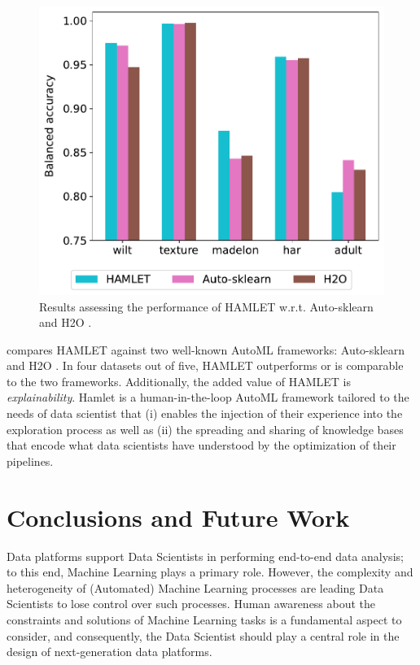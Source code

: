 \begin{figure}[t]
    \centering
    \includegraphics[scale=.45]{chapters/human-centric/hamlet/img/comparison.pdf}
    \caption{Results assessing the performance of HAMLET w.r.t. Auto-sklearn \cite{feurer2019auto} and H2O \cite{ledell2020h2o}.}
    \label{hamlet-fig:comparison}
\end{figure}


 compares HAMLET against two well-known AutoML frameworks: Auto-sklearn \cite{feurer2019auto} and H2O \cite{ledell2020h2o}.
In four datasets out of five, HAMLET outperforms or is comparable to the two frameworks.
Additionally, the added value of HAMLET is \textit{explainability}.
Hamlet is a human-in-the-loop AutoML framework tailored to the needs of data scientist that (i) enables the injection of their experience into the exploration process as well as (ii) the spreading and sharing of knowledge bases that encode what data scientists have understood by the optimization of their pipelines.


\section{Conclusions and Future Work}\label{hamlet-sec:conclusion}

Data platforms support Data Scientists in performing end-to-end data analysis; to this end, Machine Learning plays a primary role.
However, the complexity and heterogeneity of (Automated) Machine Learning processes are leading Data Scientists to lose control over such processes.
Human awareness about the constraints and solutions of Machine Learning tasks is a fundamental aspect to consider, and consequently, the Data Scientist should play a central role in the design of next-generation data platforms.

